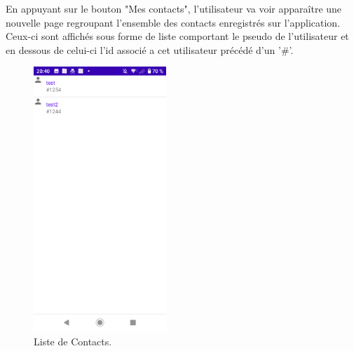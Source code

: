 En appuyant sur le bouton "Mes contacts", l'utilisateur va voir apparaître une nouvelle page regroupant l'ensemble des contacts enregistrés sur l'application. Ceux-ci sont affichés sous forme de liste comportant le pseudo de l'utilisateur et en dessous de celui-ci l'id associé a cet utilisateur précédé d'un '\#'.    
\begin{figure}[H]
    \begin{center}
    \includegraphics[width=5cm]{images/Contact_Page.png}
    \caption{Liste de Contacts.}
    \end{center}
    \end{figure}
    
